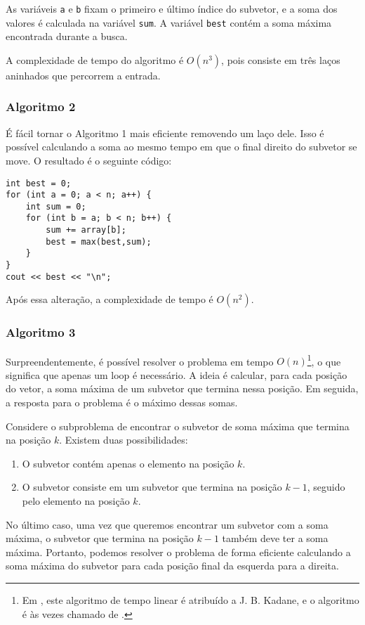 As variáveis \texttt{a} e \texttt{b} fixam o primeiro e 
último índice do subvetor, 
e a soma dos valores é calculada na variável \texttt{sum}. 
A variável \texttt{best} contém a soma máxima encontrada durante a busca.

A complexidade de tempo do algoritmo é $O(n^3)$, 
pois consiste em três laços aninhados 
que percorrem a entrada.

\subsubsection{Algoritmo 2}

É fácil tornar o Algoritmo 1 mais eficiente 
removendo um laço dele. 
Isso é possível calculando a soma ao mesmo 
tempo em que o final direito do subvetor se move. 
O resultado é o seguinte código:

\begin{lstlisting}
int best = 0;
for (int a = 0; a < n; a++) {
    int sum = 0;
    for (int b = a; b < n; b++) {
        sum += array[b];
        best = max(best,sum);
    }
}
cout << best << "\n";
\end{lstlisting}
Após essa alteração, a complexidade de tempo é $O(n^2)$.

\subsubsection{Algoritmo 3}

Surpreendentemente, é possível resolver o problema
em tempo $O(n)$\footnote{Em \cite{ben86}, este algoritmo de tempo linear 
é atribuído a J. B. Kadane, e o algoritmo é às vezes 
chamado de  .}, o que significa 
que apenas um loop é necessário.
A ideia é calcular, para cada posição do vetor, 
a soma máxima de um subvetor que termina nessa posição. 
Em seguida, a resposta para o problema é 
o máximo dessas somas.

Considere o subproblema de encontrar o subvetor de soma máxima 
que termina na posição $k$. 
Existem duas possibilidades:
\begin{enumerate}
\item O subvetor contém apenas o elemento na posição $k$.
\item O subvetor consiste em um subvetor que termina 
na posição $k-1$, seguido pelo elemento na posição $k$.
\end{enumerate}

No último caso, uma vez que queremos 
encontrar um subvetor com a soma máxima, 
o subvetor que termina na posição $k-1$ 
também deve ter a soma máxima. 
Portanto, podemos resolver o problema de forma eficiente 
calculando a soma máxima do subvetor 
para cada posição final da esquerda para a direita.

